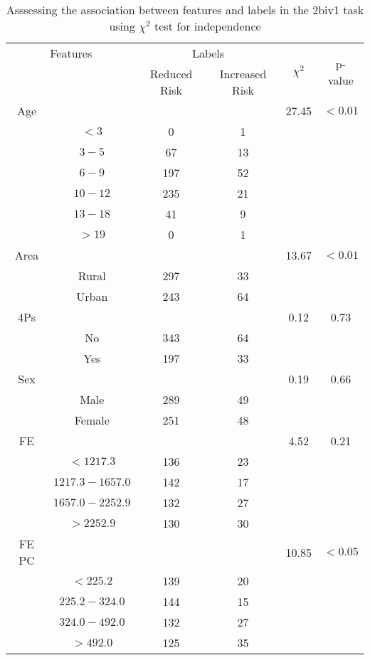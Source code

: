 \begin{table}[!htb]
\centering
\caption{Asssessing the association between features and labels in the 2biv1 task using $\chi^2$ test for independence}
\label{tab:chitest_2biv1}
\begin{tabular}{c c | c c| c | c}
\hline
\multicolumn{2}{c|}{Features}& \multicolumn{2}{c|}{Labels}& \multirow{2}{*}{$\chi^2$} & \multirow{2}{*}{p-value}\\ 
& & Reduced Risk & Increased Risk & & \\ 
\hline
Age &  &  & & 27.45 & $< 0.01$ \\ 
& $< 3$ & 0 & 1& & \\ 
& $3-5$ & 67 & 13& & \\ 
& $6-9$ & 197 & 52& & \\ 
& $10-12$ & 235 & 21& & \\ 
& $13-18$ & 41 & 9& & \\ 
& $> 19$ & 0 & 1& & \\ 
\hline 
Area &  &  & & 13.67 & $< 0.01$ \\ 
& Rural & 297 & 33& & \\ 
& Urban & 243 & 64& & \\ 
\hline 
4Ps &  &  & & 0.12 & 0.73 \\ 
& No & 343 & 64& & \\ 
& Yes & 197 & 33& & \\ 
\hline 
Sex &  &  & & 0.19 & 0.66 \\ 
& Male & 289 & 49& & \\ 
& Female & 251 & 48& & \\ 
\hline 
FE &  &  & & 4.52 & 0.21 \\ 
& $< 1217.3$ & 136 & 23& & \\ 
& $1217.3-1657.0$ & 142 & 17& & \\ 
& $1657.0-2252.9$ & 132 & 27& & \\ 
& $> 2252.9$ & 130 & 30& & \\ 
\hline 
FE PC &  &  & & 10.85 & $< 0.05$ \\ 
& $< 225.2$ & 139 & 20& & \\ 
& $225.2-324.0$ & 144 & 15& & \\ 
& $324.0-492.0$ & 132 & 27& & \\ 
& $> 492.0$ & 125 & 35& & \\ 
\hline 
\end{tabular}
\end{table}
